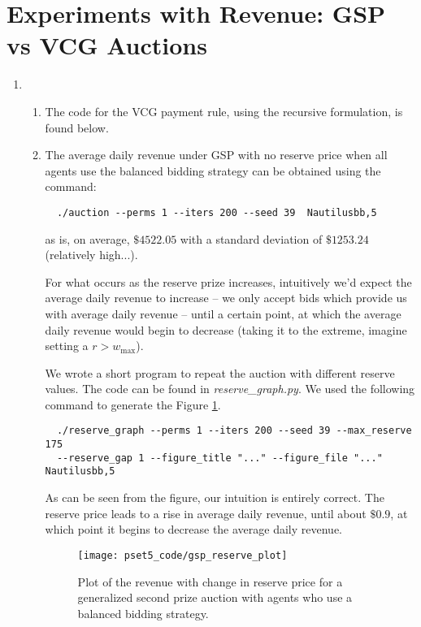 \documentclass[11pt]{article}
\begin{document}
\section*{Experiments with Revenue: GSP vs VCG Auctions}
\begin{enumerate}[resume]
\item 
  \begin{enumerate}
  \item The code for the VCG payment rule, using the recursive formulation, is found below. 
  
  
  \item 
  The average daily revenue under GSP with no reserve price when all agents use the balanced bidding strategy can be obtained using the command:
  \begin{lstlisting}
  ./auction --perms 1 --iters 200 --seed 39  Nautilusbb,5
  \end{lstlisting}
  as is, on average, $\$4522.05$ with a standard deviation of $\$1253.24$ (relatively high...).

  For what occurs as the reserve prize increases, intuitively we'd expect the average daily revenue to increase -- we only accept bids which provide us with average daily revenue -- until a certain point, at which the average daily revenue would begin to decrease (taking it to the extreme, imagine setting a $r > w_{\text{max}}$).

  We wrote a short program to repeat the auction with different reserve values. The code can be found in {\it reserve\_graph.py}. We used the following command to generate the Figure \ref{fig:gps_plot}.

  \begin{lstlisting}
  ./reserve_graph --perms 1 --iters 200 --seed 39 --max_reserve 175 
  --reserve_gap 1 --figure_title "..." --figure_file "..." Nautilusbb,5
  \end{lstlisting}
  As can be seen from the figure, our intuition is entirely correct. The reserve price leads to a rise in average daily revenue, until about $\$0.9$, at which point it begins to decrease the average daily revenue.

  \begin{figure}[h!]
  \centering
    \texttt{[image: pset5\_code/gsp\_reserve\_plot]}
    \caption{Plot of the revenue with change in reserve price for a generalized second prize auction with agents who use a balanced bidding strategy.}
    \label{fig:gps_plot}
  \end{figure}


\end{enumerate}
\end{enumerate}
\end{document}
